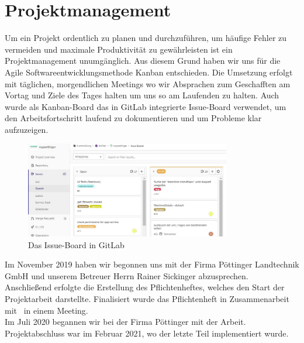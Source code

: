 \chapter{Projektmanagement}
Um ein Projekt ordentlich zu planen und durchzuführen, um häufige Fehler zu vermeiden und maximale Produktivität zu gewährleisten ist ein Projektmanagement unumgänglich. Aus diesem Grund haben wir uns für die Agile Softwareentwicklungsmethode Kanban entschieden. Die Umsetzung erfolgt mit täglichen, morgendlichen Meetings wo wir Absprachen zum Geschafften am Vortag und Ziele des Tages halten um uns so am Laufenden zu halten. Auch wurde als Kanban-Board das in GitLab integrierte Issue-Board verwendet, um den Arbeitsfortschritt laufend zu dokumentieren und um Probleme klar aufzuzeigen.\\

\begin{figure}[h]
	\centerline{
		\includegraphics[width=0.8\textwidth]{./grafiken/GitLab_issue_Board.JPG}
	}
	\vskip0pt
	\caption{Das Issue-Board in GitLab}
\end{figure}


Im November 2019 haben wir begonnen uns mit der Firma Pöttinger Landtechnik GmbH und unserem Betreuer Herrn Rainer Sickinger abzusprechen.\\
Anschließend erfolgte die Erstellung des Pflichtenheftes, welches den Start der Projektarbeit darstellte. Finalisiert wurde das Pflichtenheft in Zusammenarbeit mit \ThPartnerPersonName \ in einem Meeting.\\
Im Juli 2020 begannen wir bei der Firma Pöttinger mit der Arbeit. Projektabschluss war im Februar 2021, wo der letzte Teil implementiert wurde.

